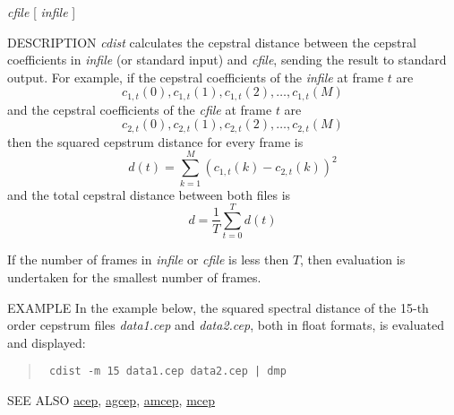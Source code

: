 \begin{synopsis}
\item [cdist] [ --m $M$ ] [ --o $O$ ] [ --f ] {\em cfile}
 	    [ {\em infile} ] 
\end{synopsis}

\begin{qsection}{DESCRIPTION}
{\em cdist} calculates the cepstral distance 
between the cepstral coefficients 
in {\em infile} (or standard input) and {\em cfile}, 
sending the result to standard output.
For example, if the cepstral coefficients of the {\em infile} at
frame $t$ are 
\begin{displaymath}
   c_{1,t}(0), c_{1,t}(1), c_{1,t}(2), \dots, c_{1,t}(M)
\end{displaymath}
and the cepstral coefficients of the {\em cfile} at frame $t$ are
\begin{displaymath}
   c_{2,t}(0), c_{2,t}(1), c_{2,t}(2), \dots, c_{2,t}(M)
\end{displaymath}
then the squared cepstrum distance for every frame is
\begin{displaymath}
   d(t)=\sum_{k=1}^{M} (c_{1,t}(k)-c_{2,t}(k))^2
\end{displaymath}
and the total cepstral distance between both files is
\begin{displaymath}
   d=\frac{1}{T} \sum_{t=0}^{T} d(t)
\end{displaymath}

If the number of frames in {\em infile} or {\em cfile} is less
then $T$, then evaluation is undertaken for the smallest number of frames.
\end{qsection}

\begin{options}
\end{options}

\begin{qsection}{EXAMPLE}
In the example below, the squared spectral distance of the 15-th order
cepstrum files {\em data1.cep} and {\em data2.cep},
both in float formats, is evaluated and displayed:
\begin{quote}
\verb! cdist -m 15 data1.cep data2.cep | dmp !
\end{quote}
\end{qsection}

\begin{qsection}{SEE ALSO}
\hyperlink{acep}{acep},
\hyperlink{agcep}{agcep},
\hyperlink{amcep}{amcep},
\hyperlink{mcep}{mcep}
\end{qsection}
